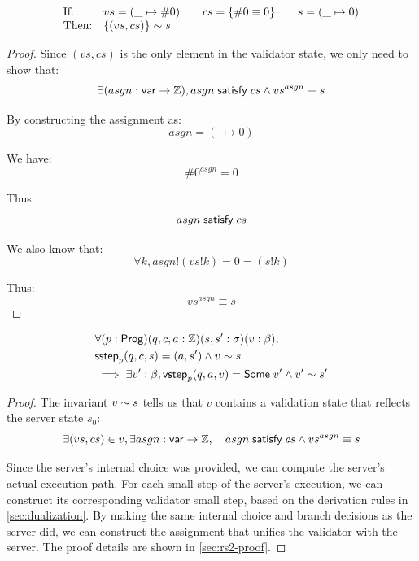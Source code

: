 \begin{lemma}[\ref{eq:rs1}]
\[\begin{array}{ll}
\text{If:}&
vs=(\_\mapsto\#0)\qquad
cs=\{\#0\equiv0\}\qquad
s=(\_\mapsto0)\\
\text{Then:}&\{(vs,cs)\}\sim s
\end{array}\]
\end{lemma}
\begin{proof}
Since $(vs,cs)$ is the only element in the validator state, we only need to show
that:
\[\exists(asgn:\mathsf{var}\to\mathbb Z),asgn\;\mathsf{satisfy}\;cs\wedge vs^{asgn}\equiv s\]

By constructing the assignment as: \[asgn=(\_\mapsto0)\]

We have: \[\#0^{asgn}=0\]

Thus: \[asgn\;\mathsf{satisfy}\;cs\]

We also know that: \[\forall k, asgn!(vs!k)=0=(s!k)\]

Thus: \[vs^{asgn}\equiv s\]
\end{proof}

\begin{lemma}[\ref{eq:rs2}]
  \begin{align*}
    &\forall(p:\mathsf{Prog})(q,c,a:\mathbb Z)(s,s':\sigma)(v:\beta),\\
    &\mathsf{sstep}_p(q,c,s)=(a,s')\wedge v\sim s\\
    &\implies\exists v':\beta,\mathsf{vstep}_p(q,a,v)=\mathsf{Some}\;v'\wedge v'\sim s'
  \end{align*}
\begin{proof}
The invariant $v\sim s$ tells us that $v$ contains a validation state
that reflects the server state $s_0$:
\[\exists(vs,cs)\in v,\exists asgn:\mathsf{var}\to\mathbb Z,\quad asgn\;\mathsf{satisfy}\;cs\wedge {vs}^{asgn}\equiv s\]

Since the server's internal choice was provided, we can compute the server's
actual execution path.  For each small step of the server's execution, we can
construct its corresponding validator small step, based on the derivation rules
in \autoref{sec:dualization}.  By making the same internal choice and branch
decisions as the server did, we can construct the assignment that unifies the
validator with the server.  The proof details are shown in \autoref{sec:rs2-proof}.
\end{proof}
\end{lemma}

